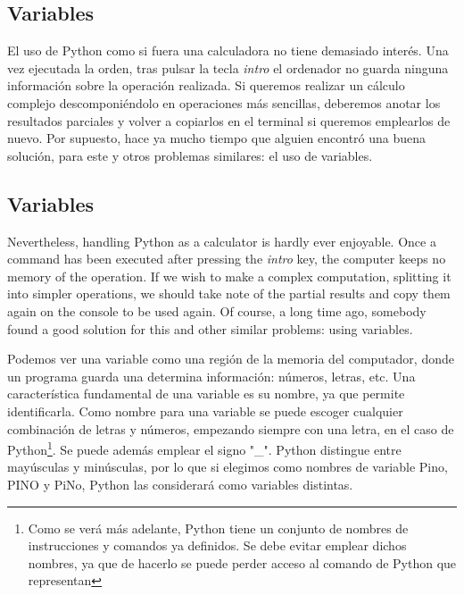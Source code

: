 \begin{paracol}{2}
\subsection{Variables}
El uso de Python como si fuera una calculadora no tiene demasiado interés. Una vez ejecutada la orden, tras pulsar la tecla \emph{intro} el ordenador no guarda ninguna información sobre la operación realizada. Si queremos realizar un cálculo complejo descomponiéndolo en operaciones más sencillas, deberemos anotar los resultados parciales y volver a copiarlos en el terminal si queremos emplearlos de nuevo. Por supuesto, hace ya mucho tiempo que alguien encontró una buena solución, para este y otros problemas similares: el uso de variables.

\switchcolumn
\subsection{Variables}
Nevertheless, handling Python as a calculator is hardly ever enjoyable. Once a command has been executed after pressing the \emph{intro} key, the computer keeps no memory of the operation. If we wish to make a complex computation, splitting it into simpler operations, we should take note of the partial results and copy them again on the console to be used again. Of course, a long time ago, somebody found a good solution for this and other similar problems: using variables.

\switchcolumn
Podemos ver una variable como una región de la memoria del computador, donde un programa guarda una determina información: números, letras, etc. Una característica fundamental de una variable es su nombre, ya que permite identificarla.  Como nombre para una variable se puede escoger cualquier combinación de letras y números, empezando siempre con una letra, en el caso de Python\footnote{Como se verá más adelante, Python tiene un conjunto de nombres de instrucciones y comandos ya definidos. Se debe evitar emplear dichos nombres, ya que de hacerlo se puede perder acceso al comando de Python que representan}. Se puede además emplear el signo "\_". Python distingue entre mayúsculas y minúsculas, por lo que si elegimos como nombres de variable Pino, PINO y PiNo, Python las considerará como variables distintas. 


\end{paracol}
